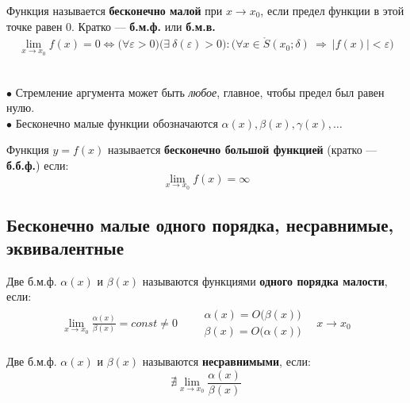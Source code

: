 \begin{definition}
  Функция называется \textbf{бесконечно малой} при $x \to x_0$, если предел функции в этой точке равен $0$. Кратко --- \textbf{б.м.ф.} или \textbf{б.м.в.}
  \begin{gather*}
    \lim_{x \to x_0} f(x) = 0 \iff \big(\forall \varepsilon > 0\big)\big(\exists\ \delta(\varepsilon) > 0\big)\colon \big(\forall x \in \mathring{S}(x_0; \delta)\ \Rightarrow\ |f(x)| < \varepsilon \big)
  \end{gather*}
\end{definition}
\begin{note}\ \\
  $\bullet$ Стремление аргумента может быть \textit{любое}, главное, чтобы предел был равен нулю.\\
  $\bullet$ Бесконечно малые функции обозначаются $\alpha(x), \beta(x), \gamma(x),\ldots$
\end{note}

\begin{definition}
  Функция $y = f(x)$ называется \textbf{бесконечно большой функцией} (кратко --- \textbf{б.б.ф.}) если: \[ \lim_{x \to x_0} f(x) = \infty \] 
\end{definition}


\subsection{Бесконечно малые одного порядка, несравнимые, эквивалентные}

\begin{definition}
  Две б.м.ф. $\alpha(x)$ и $\beta(x)$ называются функциями \textbf{одного порядка малости}, если:
  \begin{gather*}
  \lim_{x \to x_0} \frac{\alpha(x)}{\beta(x)} = const \neq 0 \qquad
    \begin{aligned}
      \alpha(x) = O\big(\beta(x)\big) \\
      \beta(x) = O\big(\alpha(x)\big)
    \end{aligned}\quad x\to x_0
  \end{gather*}
\end{definition}

\begin{definition}
  Две б.м.ф. $\alpha(x)$ и $\beta(x)$ называются \textbf{несравнимыми}, если:
  \[
  \nexists \lim_{x \to x_0} \frac{\alpha(x)}{\beta(x)}
  \] 
\end{definition}


